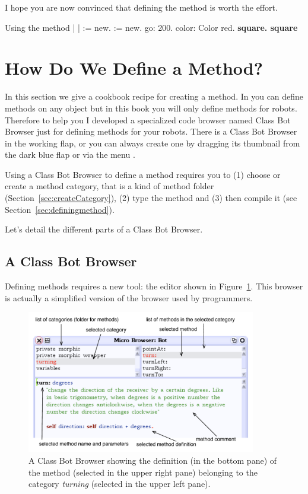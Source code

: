 I hope you are now convinced that defining the method is worth the effort. 
   
\begin{scriptwithtitle}{Using the method }\label{src:againSquareMethod}
| \caro \daly | 
\caro := \Turtle new.  
\daly := \Turtle new.  
\daly go: 200.  
\daly color: Color red.
\textbf{\caro square.
\daly square}
\end{scriptwithtitle}



\section{How Do We Define a Method?}
In this section we give a cookbook recipe for creating a method. In \sq you can define methods on any object but in this book you will only define methods for robots. Therefore to help you I developed a specialized code browser named Class Bot Browser just for defining methods for your robots. There is a Class Bot Browser in the working flap, or you can always create one by dragging its thumbnail from the dark blue flap or via the menu .

Using a Class Bot Browser to define a method requires you to (1) choose or create a method category, that is a kind of method folder (Section~\ref{sec:createCategory}), (2) type the method and (3) then compile it (see Section~\ref{sec:definingmethod}). 

Let's detail the different parts of a Class Bot Browser.

\subsection{A Class Bot Browser}

Defining methods requires a new tool: the editor shown in Figure~\ref{fig:methodEditor}. This browser is actually a simplified version of the browser used by \st programmers. 

\begin{figure}
\centerline{\includegraphics[width=10cm]{tbOneAnnotated}} 
\caption{A Class Bot Browser showing the definition (in the bottom pane) of the 
method  (selected in the upper right pane) belonging to the category \emph{turning} (selected in the upper left pane).\label{fig:methodEditor}}
\end{figure}

